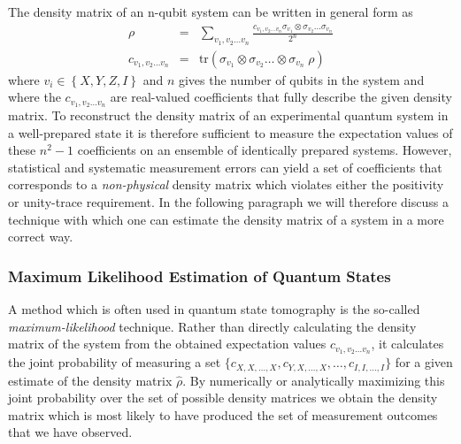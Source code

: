 The density matrix of an n-qubit system can be written in general form as
\begin{eqnarray}
\rho & = & \sum\limits_{v_1,v_2\hdots v_n} \frac{c_{v_1,v_2\hdots v_n} \sigma_{v_1}\otimes \sigma_{v_2}\hdots \sigma_{v_n}}{2^n} \label{eq:state_tomography_state_representation} \\
c_{v_1,v_2\hdots v_n} & = & \mathrm{tr}\left(\sigma_{v_1}\otimes \sigma_{v_2}\hdots \otimes\sigma_{v_n} \; \rho \right)  \label{eq:state_tomography_coefficients}
\end{eqnarray}
where $v_i \in \left\{ X,Y,Z,I\right\}$ and $n$ gives the number of qubits in the system and where the $c_{v_1,v_2\hdots v_n}$ are real-valued coefficients that fully describe the given density matrix. To reconstruct the density matrix of an experimental quantum system in a well-prepared state it is therefore sufficient to measure the expectation values of these $n^2-1$ coefficients on an ensemble of identically prepared systems. However, statistical and systematic measurement errors can yield a set of coefficients that corresponds to a {\it non-physical} density matrix which violates either the positivity or unity-trace requirement. In the following paragraph we will therefore discuss a technique with which one can estimate the density matrix of a system in a more correct way.

\subsubsection{Maximum Likelihood Estimation of Quantum States}

A method which is often used in quantum state tomography is the so-called {\it maximum-likelihood} technique. Rather than directly calculating the density matrix of the system from the obtained expectation values $c_{v_1,v_2\hdots v_n}$, it calculates the joint probability of measuring a set $\{c_{X,X,\hdots,X},c_{Y,X,\hdots,X},\hdots,c_{I,I,\hdots,I}\}$ for a given estimate of the density matrix $\hat{\rho}$. By numerically or analytically maximizing this joint probability over the set of possible density matrices we obtain the density matrix which is most likely to have produced the set of measurement outcomes that we have observed.


